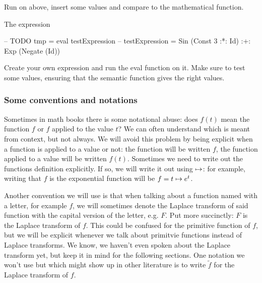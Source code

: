\begin{example}
  Run  on  above, insert some values and compare
  to the mathematical function. 
\end{example}
\begin{solution}
  The expression
\begin{code}
 -- TODO
tmp = eval testExpression
 -- testExpression = Sin (Const 3 :*: Id) :+: Exp (Negate (Id))
\end{code}
\end{solution}
\begin{exercise}
  Create your own expression and run the eval function on it. Make sure to test
  some values, ensuring that the semantic function gives the right values.
\end{exercise}

\subsubsection{Some conventions and notations}
Sometimes in math books there is some notational abuse: does $f(t)$ mean the
function $f$ or $f$ applied to the value $t$? We can often understand
which is meant from context, but not always. We will avoid this problem by being
explicit when a function is applied to a value or not: the function will be written
$f$, the function applied to a value will be written $f(t)$. Sometimes we need
to write out the functions definition explicitly. If so, we will write it out
using $\mapsto$: for example, writing that $f$ is the exponential function will
be $f = t \mapsto e^{t}$.

Another convention we will use is that when talking about a function named with
a letter, for example $f$, we will sometimes denote the Laplace transform of
said function with the capital version of the letter, e.g. $F$. Put more
succinctly: $F$ is the Laplace transform of $f$. This could be confused for the
primitive function of $f$, but we will be explicit whenever we talk about
primitvie functions instead of Laplace transforms. We know, we haven't even spoken
about the Laplace transform yet, but keep it in mind for the following sections.
One notation we won't use but which might show up in other literature
is to write $\tilde{f}$ for the Laplace transform of $f$. 

